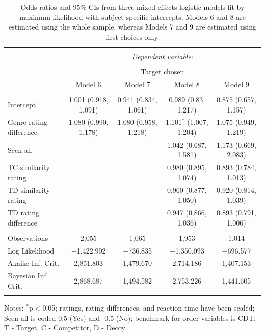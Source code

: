 \documentclass[12pt, a4paper]{article}
\begin{document}
\begin{table}[htb!]
\centering
\begin{adjustbox}{max width=\textwidth}
  \begin{threeparttable}
    \caption{Odds ratios and 95\% CIs from three mixed-effects logistic models fit by maximum likelihood with subject-specific intercepts. Models 6 and 8 are estimated using the whole sample, whereas Models 7 and 9 are estimated using first choices only. }
  \label{genres}
\begin{tabular}{@{\extracolsep{5pt}}lcccc} 
\\[-1.8ex]\hline 
\hline \\[-1.8ex] 
 & \multicolumn{4}{c}{\textit{Dependent variable:}} \\ 
\cline{2-5} 
\\[-1.8ex] & \multicolumn{4}{c}{Target chosen} \\ 
 & Model 6 & Model 7 & Model 8 & Model 9 \\  
\hline \\[-1.8ex] 
  Intercept & 1.001 (0.918, 1.091) & 0.941 (0.834, 1.061) & 0.989 (0.83, 1.217) & 0.875 (0.657, 1.157) \\ 
  Genre rating difference & 1.080 (0.990, 1.178) & 1.080 (0.958, 1.218) & 1.101$^{*}$ (1.007, 1.204) & 1.075 (0.949, 1.219) \\ 
 Seen all &  &  & 1.042 (0.687, 1.581) & 1.173 (0.669, 2.083) \\ 
 TC similarity rating &  &  & 0.980 (0.895, 1.074) & 0.893 (0.784, 1.013) \\
 TD similarity rating &  &  & 0.960 (0.877, 1.050) & 0.920 (0.814, 1.039) \\  
 TD rating difference &  &  & 0.947 (0.866, 1.036) & 0.893 (0.791, 1.006) \\ 
 \hline \\[-1.8ex] 
Observations & 2,055 & 1,065 & 1,953 & 1,014 \\ 
Log Likelihood & $-$1,422.902 & $-$736.835 & $-$1,350.093 & $-$696.577 \\ 
Akaike Inf. Crit. & 2,851.803 & 1,479.670 & 2,714.186 & 1,407.153 \\ 
Bayesian Inf. Crit. & 2,868.687 & 1,494.582 & 2,753.226 & 1,441.605 \\ 
\hline 
\hline \\[-1.8ex] 
\end{tabular} 
    \begin{tablenotes}
      \small
      \item Notes: $^{*}$p$<$0.05; ratings, rating differences, and reaction time have been scaled; Seen all is coded 0.5 (Yes) and -0.5 (No); benchmark for order variables is CDT; T - Target, C - Competitor, D - Decoy
    \end{tablenotes}
  \end{threeparttable}
  \end{adjustbox}
\end{table}
\end{document}
